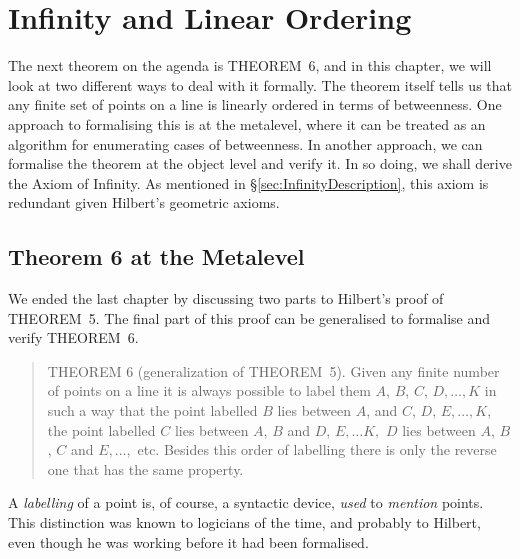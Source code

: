 \chapter{Infinity and Linear Ordering}\label{chapter:LinearOrder}
The next theorem on the agenda is THEOREM~6, and in this chapter, we will look at two different ways to deal with it formally. The theorem itself tells us that any finite set of points on a line is linearly ordered in terms of betweenness. One approach to formalising this is at the metalevel, where it can be treated as an algorithm for enumerating cases of betweenness. In another approach, we can formalise the theorem at the object level and verify it. In so doing, we shall derive the Axiom of Infinity. As mentioned in \S\ref{sec:InfinityDescription}, this axiom is redundant given Hilbert's geometric axioms.

\section{Theorem 6 at the Metalevel}\label{sec:Theorem6}
We ended the last chapter by discussing two parts to Hilbert's proof of THEOREM~5. The final part of this proof can be generalised to formalise and verify THEOREM~6.

\begin{quote}THEOREM 6 (generalization of THEOREM~5). Given any finite number of points on a line it is always possible to label them $A$, $B$, $C$, $D, \ldots, K$ in such a way that the point labelled $B$ lies between $A$, and $C$, $D$, $E, \ldots, K$, the point labelled $C$ lies between $A$, $B$ and $D$, $E,\ldots K,$ $D$ lies between $A$, $B$, $C$ and $E, \ldots,$ etc. Besides this order of labelling there is only the reverse one that has the same property.
\end{quote}

A \emph{labelling} of a point is, of course, a syntactic device, \emph{used} to \emph{mention} points. This distinction was known to logicians of the time, and probably to Hilbert, even though he was working before it had been formalised.

